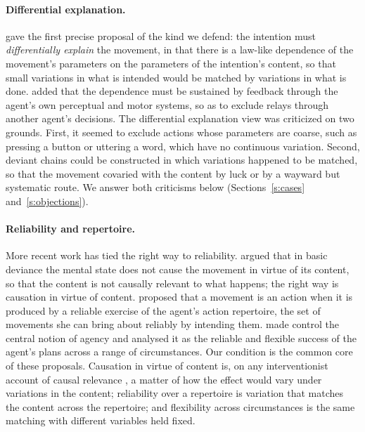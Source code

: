\documentclass{situationist-preprint}
\begin{document}
\paragraph{Differential explanation.} \citet{Peacocke1979} gave the first precise proposal of the kind we defend: the intention must \emph{differentially explain} the movement, in that there is a law-like dependence of the movement's parameters on the parameters of the intention's content, so that small variations in what is intended would be matched by variations in what is done. \citet{Bishop1989} added that the dependence must be sustained by feedback through the agent's own perceptual and motor systems, so as to exclude relays through another agent's decisions. The differential explanation view was criticized on two grounds. First, it seemed to exclude actions whose parameters are coarse, such as pressing a button or uttering a word, which have no continuous variation. Second, deviant chains could be constructed in which variations happened to be matched, so that the movement covaried with the content by luck or by a wayward but systematic route. We answer both criticisms below (Sections~\ref{s:cases} and~\ref{s:objections}).

\paragraph{Reliability and repertoire.} More recent work has tied the right way to reliability. \citet{Schlosser2007} argued that in basic deviance the mental state does not cause the movement in virtue of its content, so that the content is not causally relevant to what happens; the right way is causation in virtue of content. \citet{Aguilar2012} proposed that a movement is an action when it is produced by a reliable exercise of the agent's action repertoire, the set of movements she can bring about reliably by intending them. \citet{Shepherd2021} made control the central notion of agency and analysed it as the reliable and flexible success of the agent's plans across a range of circumstances. Our condition is the common core of these proposals. Causation in virtue of content is, on any interventionist account of causal relevance \citep{Woodward2003}, a matter of how the effect would vary under variations in the content; reliability over a repertoire is variation that matches the content across the repertoire; and flexibility across circumstances is the same matching with different variables held fixed.
\end{document}

